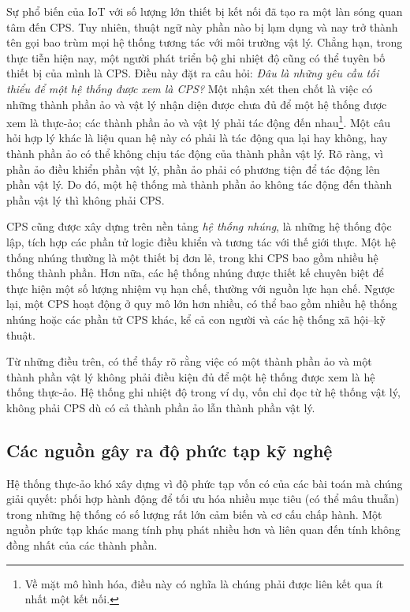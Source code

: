 Sự phổ biến của IoT với số lượng lớn thiết bị kết nối đã tạo ra một làn sóng quan tâm đến CPS. Tuy nhiên, thuật ngữ này phần nào bị lạm dụng và nay trở thành tên gọi bao trùm mọi hệ thống tương tác với môi trường vật lý. Chẳng hạn, trong thực tiễn hiện nay, một người phát triển bộ ghi nhiệt độ cũng có thể tuyên bố thiết bị của mình là CPS. Điều này đặt ra câu hỏi: \emph{Đâu là những yêu cầu tối thiểu để một hệ thống được xem là CPS?} Một nhận xét then chốt là việc có những thành phần ảo và vật lý nhận diện được chưa đủ để một hệ thống được xem là thực-ảo; các thành phần ảo và vật lý phải tác động đến nhau\footnote{Về mặt mô hình hóa, điều này có nghĩa là chúng phải được liên kết qua ít nhất một kết nối.}. Một câu hỏi hợp lý khác là liệu quan hệ này có phải là tác động qua lại hay không, hay thành phần ảo có thể không chịu tác động của thành phần vật lý. Rõ ràng, vì phần ảo điều khiển phần vật lý, phần ảo phải có phương tiện để tác động lên phần vật lý. Do đó, một hệ thống mà thành phần ảo không tác động đến thành phần vật lý thì không phải CPS.

CPS cũng được xây dựng trên nền tảng \emph{hệ thống nhúng}, là những hệ thống độc lập, tích hợp các phần tử logic điều khiển và tương tác với thế giới thực. Một hệ thống nhúng thường là một thiết bị đơn lẻ, trong khi CPS bao gồm nhiều hệ thống thành phần. Hơn nữa, các hệ thống nhúng được thiết kế chuyên biệt để thực hiện một số lượng nhiệm vụ hạn chế, thường với nguồn lực hạn chế. Ngược lại, một CPS hoạt động ở quy mô lớn hơn nhiều, có thể bao gồm nhiều hệ thống nhúng hoặc các phần tử CPS khác, kể cả con người và các hệ thống xã hội--kỹ thuật.

Từ những điều trên, có thể thấy rõ rằng việc có một thành phần ảo và một thành phần vật lý không phải điều kiện đủ để một hệ thống được xem là hệ thống thực-ảo. Hệ thống ghi nhiệt độ trong ví dụ, vốn chỉ đọc từ hệ thống vật lý, không phải CPS dù có cả thành phần ảo lẫn thành phần vật lý.

\subsection{Các nguồn gây ra độ phức tạp kỹ nghệ}
Hệ thống thực-ảo khó xây dựng vì độ phức tạp vốn có của các bài toán mà chúng giải quyết: phối hợp hành động để tối ưu hóa nhiều mục tiêu (có thể mâu thuẫn) trong những hệ thống có số lượng rất lớn cảm biến và cơ cấu chấp hành. Một nguồn phức tạp khác mang tính phụ phát nhiều hơn và liên quan đến tính không đồng nhất của các thành phần.

